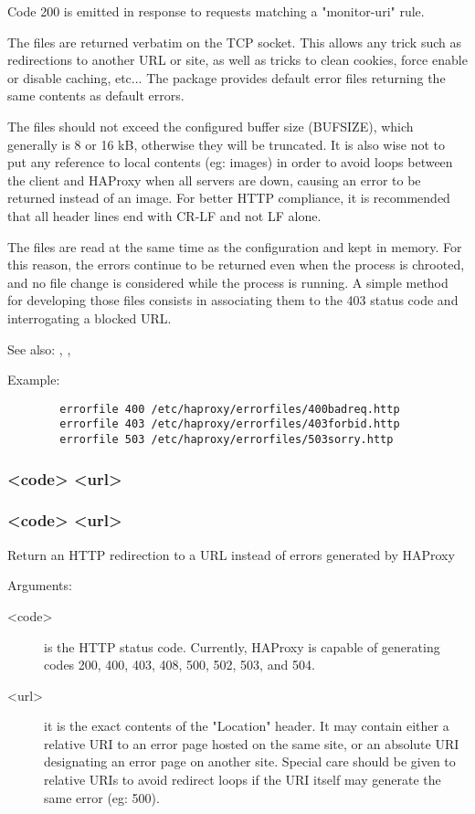   Code 200 is emitted in response to requests matching a "monitor-uri" rule.

  The files are returned verbatim on the TCP socket. This allows any trick such
  as redirections to another URL or site, as well as tricks to clean cookies,
  force enable or disable caching, etc... The package provides default error
  files returning the same contents as default errors.

  The files should not exceed the configured buffer size (BUFSIZE), which
  generally is 8 or 16 kB, otherwise they will be truncated. It is also wise
  not to put any reference to local contents (eg: images) in order to avoid
  loops between the client and HAProxy when all servers are down, causing an
  error to be returned instead of an image. For better HTTP compliance, it is
  recommended that all header lines end with CR-LF and not LF alone.

  The files are read at the same time as the configuration and kept in memory.
  For this reason, the errors continue to be returned even when the process is
  chrooted, and no file change is considered while the process is running. A
  simple method for developing those files consists in associating them to the
  403 status code and interrogating a blocked URL.


See also: , , 

  Example:
  \begin{verbatim}
        errorfile 400 /etc/haproxy/errorfiles/400badreq.http
        errorfile 403 /etc/haproxy/errorfiles/403forbid.http
        errorfile 503 /etc/haproxy/errorfiles/503sorry.http
  \end{verbatim}

\subsubsection[errorloc]{ <code> <url>}
\subsubsection[errorloc302]{ <code> <url>}

  Return an HTTP redirection to a URL instead of errors generated by HAProxy
  
  
  Arguments:
  \begin{description}
  \item[<code>]    is the HTTP status code. Currently, HAProxy is capable of
              generating codes 200, 400, 403, 408, 500, 502, 503, and 504.

  \item[<url>]     it is the exact contents of the "Location" header. It may contain
              either a relative URI to an error page hosted on the same site,
              or an absolute URI designating an error page on another site.
              Special care should be given to relative URIs to avoid redirect
              loops if the URI itself may generate the same error (eg: 500).
  \end{description}

